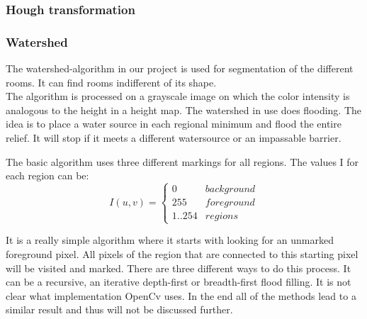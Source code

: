 \subsubsection{Hough transformation}
\subsubsection{Watershed}
The watershed-algorithm in our project is used for segmentation of the different rooms. It can find rooms indifferent of its shape.
\\
The algorithm is processed on a grayscale image on which the color intensity is analogous to the height in a height map. The watershed in use does flooding. The idea is to place a water source in each regional minimum and flood the entire relief. It will stop if it meets a different watersource or an impassable barrier.

The basic algorithm uses three different markings for all regions. The values I for each region can be:
\[I(u,v) = \begin{cases} 0 & background \\  255 & foreground \\ 1..254 & regions \end{cases} \]

It is a really simple algorithm where it starts with looking for an unmarked foreground pixel. All pixels of the region that are connected to this starting pixel will be visited and marked. There are three different ways to do this process. It can be a recursive, an iterative depth-first or breadth-first flood filling. It is not clear what implementation OpenCv uses. In the end all of the methods lead to a similar result and thus will not be discussed further. 


